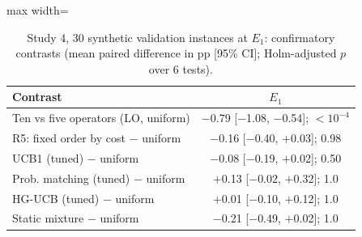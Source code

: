 \begin{table}[t]
\caption{Study 4, 30 synthetic validation instances at $E_1$: confirmatory contrasts (mean paired difference in pp [95\% CI]; Holm-adjusted $p$ over 6 tests).}\label{tab:s4val}
\centering
\small
\begin{adjustbox}{max width=\linewidth}
\begin{tabular}{lc}
\toprule
Contrast & $E_1$ \\
\midrule
Ten vs five operators (LO, uniform) & $-$0.79 [$-$1.08, $-$0.54]; \ensuremath{<10^{-4}} \\
R5: fixed order by cost $-$ uniform & $-$0.16 [$-$0.40, $+$0.03]; 0.98 \\
UCB1 (tuned) $-$ uniform & $-$0.08 [$-$0.19, $+$0.02]; 0.50 \\
Prob. matching (tuned) $-$ uniform & $+$0.13 [$-$0.02, $+$0.32]; 1.0 \\
HG-UCB (tuned) $-$ uniform & $+$0.01 [$-$0.10, $+$0.12]; 1.0 \\
Static mixture $-$ uniform & $-$0.21 [$-$0.49, $+$0.02]; 1.0 \\
\bottomrule
\end{tabular}
\end{adjustbox}
\end{table}
